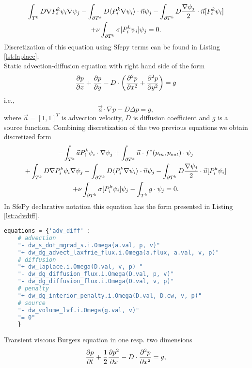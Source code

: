 \begin{multline}
	\int_{T^k} D\nabla P^k_i\psi_i \nabla \psi_j
	- \int_{\partial T^k} D \langle P^k_i\nabla\psi_i\rangle \cdot \vec{n}\psi_j 
    - \int_{\partial T^k} D \frac{\nabla \psi_j}{2}\cdot \vec{n} [P^k_i\psi_i] \\ 
    + \nu \int_{\partial T^k} \sigma [P^k_i\psi_i]\psi_j 
    = 0.
\end{multline}
Discretization of this equation using Sfepy terms can be found in Listing 
\ref{lst:laplace};\\
Static advection-diffusion equation with right hand side of the form
\begin{equation}
\label{eq:ex_advdiff}
\frac{\partial p}{\partial x} + \frac{\partial p}{\partial y} - D \cdot \left( \frac{\partial^2 p}{\partial x^2} + \frac{\partial^2 
p}{\partial y^2} \right) = g
\end{equation}
i.e.,
\begin{equation}
\vec{a} \cdot \nabla p - D \Delta p = g,
\end{equation}
where $\vec{a} = [1, 1]^T$ is advection velocity, $D$ is diffusion coefficient and $g$ is 
a source function. Combining discretization of the two previous equations we obtain 
discretized form
\begin{multline}
- \int_{T^k} \vec{a}P_i^k\psi_i\cdot\nabla\psi_j 
+ \int_{\partial{T^k}} \vec{n}\cdot f^{*} (p_{in}, p_{out})\cdot\psi_j\\
+ \int_{T^k} D\nabla P^k_i\psi_i \nabla \psi_j
- \int_{\partial T^k} D \langle P^k_i\nabla\psi_i\rangle \cdot \vec{n}\psi_j
- \int_{\partial T^k} D \frac{\nabla \psi_j}{2}\cdot \vec{n} [P^k_i\psi_i] \\
+ \nu \int_{\partial T^k} \sigma [P^k_i\psi_i]\psi_j
- \int_{T^k} g\cdot \psi_j
= 0.
\end{multline}
In SfePy declarative notation this equation has the form presented in 
Listing \ref{lst:advdiff}.
\setcounter{lstannotation}{0}
\begin{lstlisting}[language=Python, caption=Static advection-diffusion equation
\label{lst:advdiff}]
equations = {'adv_diff' :
	# advection
	"- dw_s_dot_mgrad_s.i.Omega(a.val, p, v)"
	"+ dw_dg_advect_laxfrie_flux.i.Omega(a.flux, a.val, v, p)"
	# diffusion
	"+ dw_laplace.i.Omega(D.val, v, p) "
	"- dw_dg_diffusion_flux.i.Omega(D.val, p, v)"
	"- dw_dg_diffusion_flux.i.Omega(D.val, v, p)"
	# penalty
	"+ dw_dg_interior_penalty.i.Omega(D.val, D.cw, v, p)"
	# source
	"- dw_volume_lvf.i.Omega(g.val, v)"
	"= 0"
	}
\end{lstlisting}
Transient viscous Burgers equation in one resp. two dimensions
\begin{equation}
\frac{\partial p}{\partial t} + \frac{1}{2}\frac{\partial p^2}{\partial x} - D \cdot\frac{\partial^2 p}{\partial x^2} = g,
\end{equation}
